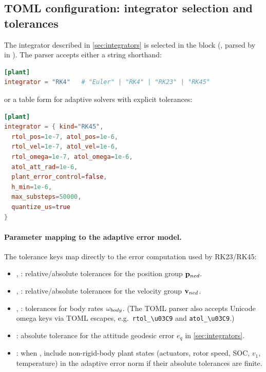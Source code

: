 \subsection{TOML configuration: integrator selection and tolerances}
\label{sec:integrator-toml}

The integrator described in \cref{sec:integrators} is selected in the \code{[plant]} block (, parsed by  in ). The parser accepts either a string shorthand:
\begin{lstlisting}[language=toml]
[plant]
integrator = "RK4"   # "Euler" | "RK4" | "RK23" | "RK45"
\end{lstlisting}
or a table form for adaptive solvers with explicit tolerances:
\begin{lstlisting}[language=toml]
[plant]
integrator = { kind="RK45",
  rtol_pos=1e-7, atol_pos=1e-6,
  rtol_vel=1e-7, atol_vel=1e-6,
  rtol_omega=1e-7, atol_omega=1e-6,
  atol_att_rad=1e-6,
  plant_error_control=false,
  h_min=1e-6,
  max_substeps=50000,
  quantize_us=true
}
\end{lstlisting}

\paragraph{Parameter mapping to the adaptive error model.}
The tolerance keys map directly to the error computation used by RK23/RK45:
\begin{itemize}[leftmargin=*,itemsep=2pt]
  \item {}, : relative/absolute tolerances for the position group \(\mathbf{p}_{ned}\).
  \item {}, : relative/absolute tolerances for the velocity group \(\mathbf{v}_{ned}\).
  \item {}, : tolerances for body rates \(\mathbf{\omega}_{body}\). (The TOML parser also accepts Unicode omega keys via TOML escapes, e.g.\ \verb|rtol_\u03C9| and \verb|atol_\u03C9|.)
  \item {}: absolute tolerance for the attitude geodesic error \(e_q\) in \cref{sec:integrators}.
  \item {}: when , include non-rigid-body plant states (actuators, rotor speed, SOC, \(v_1\), temperature) in the adaptive error norm if their absolute tolerances are finite.
\end{itemize}

